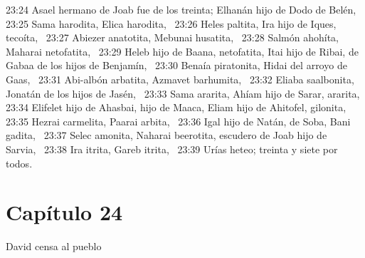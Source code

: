 23:24 Asael hermano de Joab fue de los treinta; Elhanán hijo de Dodo de Belén,  
23:25 Sama harodita, Elica harodita,  
23:26 Heles paltita, Ira hijo de Iques, tecoíta,  
23:27 Abiezer anatotita, Mebunai husatita,  
23:28 Salmón ahohíta, Maharai netofatita,  
23:29 Heleb hijo de Baana, netofatita, Itai hijo de Ribai, de Gabaa de los hijos de Benjamín,  
23:30 Benaía piratonita, Hidai del arroyo de Gaas,  
23:31 Abi-albón arbatita, Azmavet barhumita,  
23:32 Eliaba saalbonita, Jonatán de los hijos de Jasén,  
23:33 Sama ararita, Ahíam hijo de Sarar, ararita, 
23:34 Elifelet hijo de Ahasbai, hijo de Maaca, Eliam hijo de Ahitofel, gilonita,  
23:35 Hezrai carmelita, Paarai arbita,  
23:36 Igal hijo de Natán, de Soba, Bani gadita,  
23:37 Selec amonita, Naharai beerotita, escudero de Joab hijo de Sarvia,  
23:38 Ira itrita, Gareb itrita,  
23:39 Urías heteo; treinta y siete por todos.  
\section*{Capítulo 24}
David censa al pueblo  


